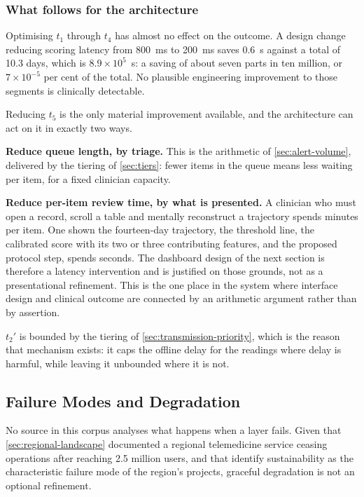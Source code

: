 \documentclass[12pt,a4paper,oneside]{report}
\begin{document}
\subsubsection{What follows for the architecture}

Optimising $t_1$ through $t_4$ has almost no effect on the outcome. A design change reducing scoring latency from 800~ms to 200~ms saves 0.6~s against a total of 10.3 days, which is $8.9 \times 10^5$~s: a saving of about seven parts in ten million, or $7 \times 10^{-5}$ per cent of the total. No plausible engineering improvement to those segments is clinically detectable.

Reducing $t_5$ is the only material improvement available, and the architecture can act on it in exactly two ways.

\textbf{Reduce queue length, by triage.} This is the arithmetic of \cref{sec:alert-volume}, delivered by the tiering of \cref{sec:tiers}: fewer items in the queue means less waiting per item, for a fixed clinician capacity.

\textbf{Reduce per-item review time, by what is presented.} A clinician who must open a record, scroll a table and mentally reconstruct a trajectory spends minutes per item. One shown the fourteen-day trajectory, the threshold line, the calibrated score with its two or three contributing features, and the proposed protocol step, spends seconds. The dashboard design of the next section is therefore a latency intervention and is justified on those grounds, not as a presentational refinement. This is the one place in the system where interface design and clinical outcome are connected by an arithmetic argument rather than by assertion.

$t_2'$ is bounded by the tiering of \cref{sec:transmission-priority}, which is the reason that mechanism exists: it caps the offline delay for the readings where delay is harmful, while leaving it unbounded where it is not.

\subsection{Failure Modes and Degradation}\label{sec:failure}

No source in this corpus analyses what happens when a layer fails. Given that \cref{sec:regional-landscape} documented a regional telemedicine service ceasing operations after reaching 2.5 million users, and that \textcite{dodoo2022} identify sustainability as the characteristic failure mode of the region's projects, graceful degradation is not an optional refinement.
\end{document}

